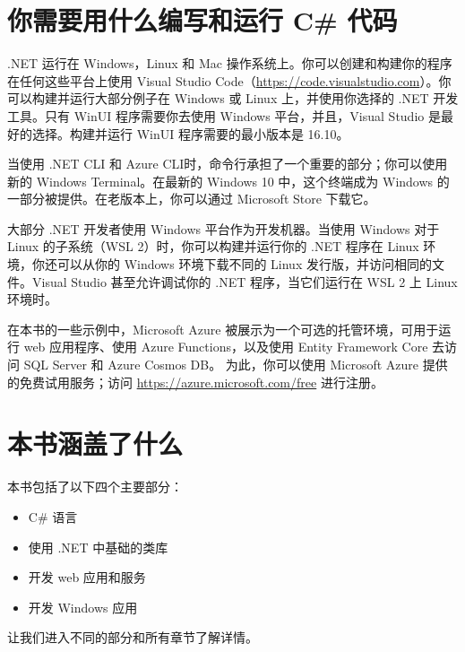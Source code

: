 \section*{你需要用什么编写和运行 C\# 代码}
.NET 运行在 Windows，Linux 和 Mac 操作系统上。你可以创建和构建你的程序在任何这些平台上使用 Visual Studio Code（\url{https://code.visualstudio.com}）。你可以构建并运行大部分例子在 Windows 或 Linux 上，并使用你选择的 .NET 开发工具。只有 WinUI 程序需要你去使用 Windows 平台，并且，Visual Studio 是最好的选择。构建并运行 WinUI 程序需要的最小版本是 16.10。

当使用 .NET CLI 和 Azure CLI时，命令行承担了一个重要的部分；你可以使用新的 Windows Terminal。在最新的 Windows 10 中，这个终端成为 Windows 的一部分被提供。在老版本上，你可以通过 Microsoft Store 下载它。

大部分 .NET 开发者使用 Windows 平台作为开发机器。当使用 Windows 对于 Linux 的子系统（WSL 2）时，你可以构建并运行你的 .NET 程序在 Linux 环境，你还可以从你的 Windows 环境下载不同的 Linux 发行版，并访问相同的文件。Visual Studio 甚至允许调试你的 .NET 程序，当它们运行在 WSL 2 上 Linux 环境时。

在本书的一些示例中，Microsoft Azure 被展示为一个可选的托管环境，可用于运行 web 应用程序、使用 Azure Functions，以及使用 Entity Framework Core 去访问 SQL Server 和 Azure Cosmos DB。
为此，你可以使用 Microsoft Azure 提供的免费试用服务；访问 \url{https://azure.microsoft.com/free} 进行注册。

\section*{本书涵盖了什么}
本书包括了以下四个主要部分：
\begin{itemize}
    \item C\# 语言
    \item 使用 .NET 中基础的类库
    \item 开发 web 应用和服务
    \item 开发 Windows 应用
\end{itemize}
让我们进入不同的部分和所有章节了解详情。

